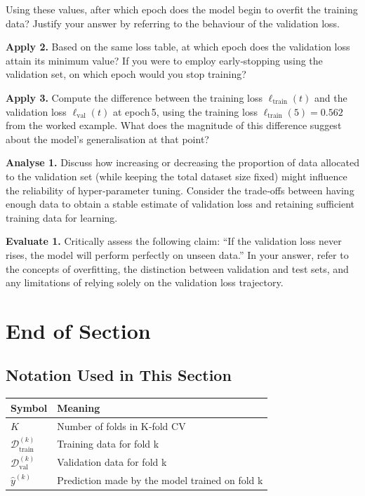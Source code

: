 \documentclass[12pt, a4paper]{article}
\begin{document}
Using these values, after which epoch does the model begin to overfit the training data? Justify your answer by referring to the behaviour of the validation loss.\newpage

\textbf{Apply 2.} Based on the same loss table, at which epoch does the validation loss attain its minimum value? If you were to employ early‑stopping using the validation set, on which epoch would you stop training?\newpage

\textbf{Apply 3.} Compute the difference between the training loss \(\ell_{\text{train}}(t)\) and the validation loss \(\ell_{\text{val}}(t)\) at epoch 5, using the training loss \(\ell_{\text{train}}(5)=0.562\) from the worked example. What does the magnitude of this difference suggest about the model’s generalisation at that point?\newpage

\textbf{Analyse 1.} Discuss how increasing or decreasing the proportion of data allocated to the validation set (while keeping the total dataset size fixed) might influence the reliability of hyper‑parameter tuning. Consider the trade‑offs between having enough data to obtain a stable estimate of validation loss and retaining sufficient training data for learning.\newpage

\textbf{Evaluate 1.} Critically assess the following claim: “If the validation loss never rises, the model will perform perfectly on unseen data.” In your answer, refer to the concepts of overfitting, the distinction between validation and test sets, and any limitations of relying solely on the validation loss trajectory.\newpage

\section{End of Section}

\newpage

\subsection*{Notation Used in This Section}
\begin{tabular}{@{}ll@{}}
\toprule
Symbol & Meaning \\ \midrule
    $K$ & Number of folds in K‑fold CV \\
    $\mathcal{D}^{(k)}_{\text{train}}$ & Training data for fold k \\
    $\mathcal{D}^{(k)}_{\text{val}}$ & Validation data for fold k \\
    $\hat{y}^{(k)}$ & Prediction made by the model trained on fold k \\
\bottomrule
\end{tabular}
\vspace{1em}
\end{document}
